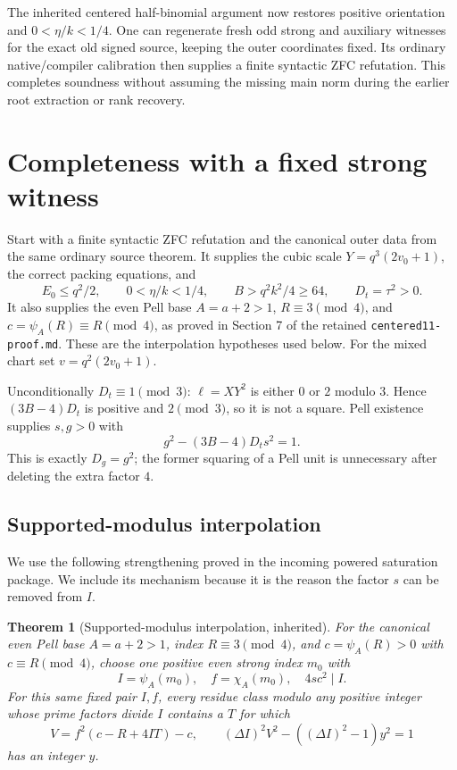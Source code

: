 \documentclass[11pt]{article}
\newtheorem{theorem}{Theorem}[section]
\theoremstyle{definition}
\theoremstyle{remark}
\begin{document}
The inherited centered half-binomial argument now restores positive
orientation and $0<\eta/k<1/4$. One can regenerate fresh odd strong
and auxiliary witnesses for the exact old signed source, keeping the
outer coordinates fixed. Its ordinary native/compiler calibration
then supplies a finite syntactic ZFC refutation. This completes
soundness without assuming the missing main norm during the earlier
root extraction or rank recovery.

\section{Completeness with a fixed strong witness}
\label{sec:completeness}

Start with a finite syntactic ZFC refutation and the canonical outer
data from the same ordinary source theorem. It supplies the cubic
scale $Y=q^3(2v_0+1)$, the correct packing equations, and
\[
 E_0\le q^2/2,\qquad0<\eta/k<1/4,
 \qquad B>q^2k^2/4\ge64,
 \qquad D_t=\tau^2>0.
\]
It also supplies the even Pell base $A=a+2>1$, $R\equiv3\pmod4$,
and $c=\psi_A(R)\equiv R\pmod4$, as proved in Section 7 of the
retained \texttt{centered11-proof.md}. These are the interpolation
hypotheses used below.
For the mixed chart set $v=q^2(2v_0+1)$.

Unconditionally $D_t\equiv1\pmod3$: $\ell=XY^2$ is either $0$
or $2$ modulo $3$. Hence $(3B-4)D_t$ is positive and $2\pmod3$,
so it is not a square. Pell existence supplies $s,g>0$ with
\[
 g^2-(3B-4)D_ts^2=1.
\]
This is exactly $D_g=g^2$; the former squaring of a Pell unit is
unnecessary after deleting the extra factor $4$.

\subsection{Supported-modulus interpolation}
We use the following strengthening proved in the incoming powered
saturation package. We include its mechanism because it is the reason
the factor $s$ can be removed from $I$.

\begin{theorem}[Supported-modulus interpolation, inherited]
\label{thm:interpolation}
For the canonical even Pell base $A=a+2>1$, index $R\equiv3\pmod4$,
and $c=\psi_A(R)>0$ with $c\equiv R\pmod4$, choose one positive
even strong index $m_0$ with
\[
 I=\psi_A(m_0),\quad f=\chi_A(m_0),\quad4sc^2\mid I.
\]
For this same fixed pair $I,f$, every residue class modulo any positive
integer whose prime factors divide $I$ contains a $T$ for which
\[
 V=f^2(c-R+4IT)-c,\qquad
 (\Delta I)^2V^2-((\Delta I)^2-1)y^2=1
\]
has an integer $y$.
\end{theorem}
\end{document}

